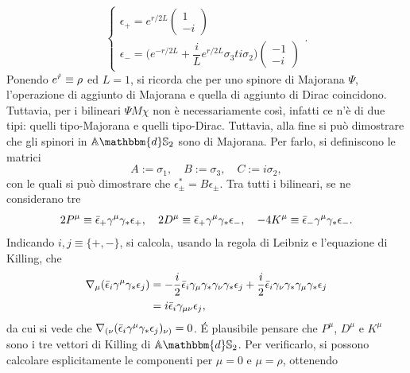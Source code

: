 \begin{equation}
    \begin{cases}
        \epsilon_+ = e^{r/2L}
        \begin{pmatrix}
            1 \\
            -i    
        \end{pmatrix} \\
        \epsilon_- = \bigg(e^{-r/2L} + \dfrac{i}{L}e^{r/2L}\sigma_3 ti\sigma_2\bigg)
        \begin{pmatrix}
            -1 \\
            -i
        \end{pmatrix}
    \end{cases}.
\end{equation}
Ponendo $e^{\hat{r}} \equiv \rho$ ed $L = 1$, si ricorda che per uno spinore di Majorana $\Psi$, l'operazione di aggiunto di Majorana e quella di aggiunto di Dirac coincidono. Tuttavia, per i bilineari $\Psi M \chi$ non è necessariamente così, infatti ce n'è di due tipi: quelli tipo-Majorana e quelli tipo-Dirac. Tuttavia, alla fine si può dimostrare che gli spinori in $\bb{A}\mathbbm{d}\bb{S}_2$ sono di Majorana. Per farlo, si definiscono le matrici 
\begin{equation}
    A := \sigma_1,\quad B := \sigma_3,\quad C := i\sigma_2,
\end{equation}
con le quali si può dimostrare che $\epsilon_\pm^* = B\epsilon_\pm$. Tra tutti i bilineari, se ne considerano tre 
\begin{equation}
    2P^\mu \equiv \bar{\epsilon}_+\gamma^\mu\gamma_*\epsilon_+,\quad 2D^\mu \equiv \bar{\epsilon}_+\gamma^\mu\gamma_*\epsilon_-,\quad -4K^\mu \equiv \bar{\epsilon}_-\gamma^\mu\gamma_*\epsilon_-.
\end{equation}
Indicando $i,j \equiv \{+,-\}$, si calcola, usando la regola di Leibniz e l'equazione di Killing, che
\begin{equation}
    \begin{split}
        \nabla_\mu(\bar{\epsilon}_i\gamma^\mu\gamma_*\epsilon_j) &= -\frac{i}{2}\bar{\epsilon}_i\gamma_\mu\gamma_*\gamma_\nu\gamma_*\epsilon_j + \frac{i}{2}\bar{\epsilon}_i\gamma_\nu\gamma_*\gamma_\mu\gamma_*\epsilon_j \\
        &= i\bar{\epsilon}_i\gamma_{\mu\nu}\epsilon_j,
    \end{split}
\end{equation}
da cui si vede che $\nabla_{(\nu}(\bar{\epsilon}_i\gamma^\mu\gamma_*\epsilon_j)_{\nu)} = 0$. \'E plausibile pensare che $P^\mu$, $D^\mu$ e $K^\mu$ sono i tre vettori di Killing di $\bb{A}\mathbbm{d}\bb{S}_2$. Per verificarlo, si possono calcolare esplicitamente le componenti per $\mu = 0$ e $\mu = \rho$, ottenendo
